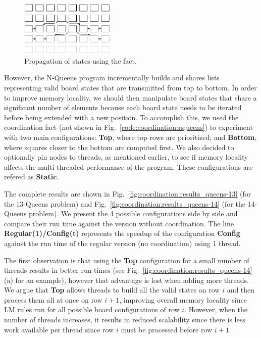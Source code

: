 \begin{figure}[ht!]
\includegraphics[width=0.4\textwidth]{figures/coordination/nqueens.pdf}
\caption{Propagation of states using the  fact.}
\label{coordination:fig:nqueens}
\end{figure}

However, the N-Queens program incrementally builds and shares lists representing
valid board states that are transmitted from top to bottom. In order to improve
memory locality, we should then manipulate board states that share a significant
number of elements because each board state needs to be iterated before being
extended with a new position. To accomplish this, we used the coordination fact
 (not shown in
Fig.~\ref{code:coordination:nqueens}) to experiment with two main
configurations: \textbf{Top}, where top rows are prioritized; and
\textbf{Bottom}, where squares closer to the bottom are computed first. We also
decided to optionally pin nodes to threads, as mentioned earlier, to see if
memory locality affects the multi-threaded performance of the program. These
configurations are refered as \textbf{Static}.

The complete results are shown in
Fig.~\ref{fig:coordination:results_queens-13} (for the 13-Queens problem) and
Fig.~\ref{fig:coordination:results_queens-14} (for the 14-Queens problem). We
present the 4 possible configurations side by side and compare their run time
against the version without coordination. The line \textbf{Regular(1)/Config(t)}
represents the speedup of the configuration \textbf{Config} against the run
time of the regular version (no coordination) using 1 thread.

The first observation is that using the \textbf{Top} configuration for a small
number of threads results in better run times (see
Fig.~\ref{fig:coordination:results_queens-14}(a) for an example), however that
advantage is lost when adding more threads. We argue that \textbf{Top} allows
threads to build all the valid states on row $i$ and then process them all at
once on row $i+1$, improving overall memory locality since LM rules run for all
possible board configurations of row $i$. However, when the number of threads
increases, it results in reduced scalability since there is less work available
per thread since row $i$ must be processed before row $i+1$.

